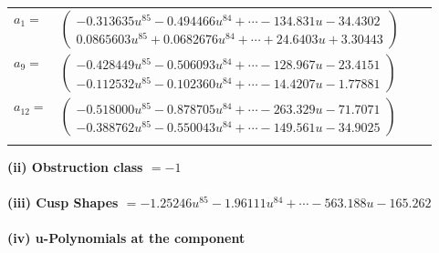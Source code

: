 \documentclass[1p]{elsarticle_modified}
\theoremstyle{definition}
\begin{document}
\begin{tabular}{m{7pt} m{180pt} m{7pt} m{180pt} }
\flushright $a_{1}=$&$\begin{pmatrix}-0.313635 u^{85}-0.494466 u^{84}+\cdots-134.831 u-34.4302\\0.0865603 u^{85}+0.0682676 u^{84}+\cdots+24.6403 u+3.30443\end{pmatrix}$ \\
\flushright $a_{9}=$&$\begin{pmatrix}-0.428449 u^{85}-0.506093 u^{84}+\cdots-128.967 u-23.4151\\-0.112532 u^{85}-0.102360 u^{84}+\cdots-14.4207 u-1.77881\end{pmatrix}$ \\
\flushright $a_{12}=$&$\begin{pmatrix}-0.518000 u^{85}-0.878705 u^{84}+\cdots-263.329 u-71.7071\\-0.388762 u^{85}-0.550043 u^{84}+\cdots-149.561 u-34.9025\end{pmatrix}$\\&\end{tabular}
\flushleft \textbf{(ii) Obstruction class $= -1$}\\~\\
\flushleft \textbf{(iii) Cusp Shapes $= -1.25246 u^{85}-1.96111 u^{84}+\cdots-563.188 u-165.262$}\\~\\
\newpage\renewcommand{\arraystretch}{1}
\flushleft \textbf{(iv) u-Polynomials at the component}\newline \\
\end{document}
